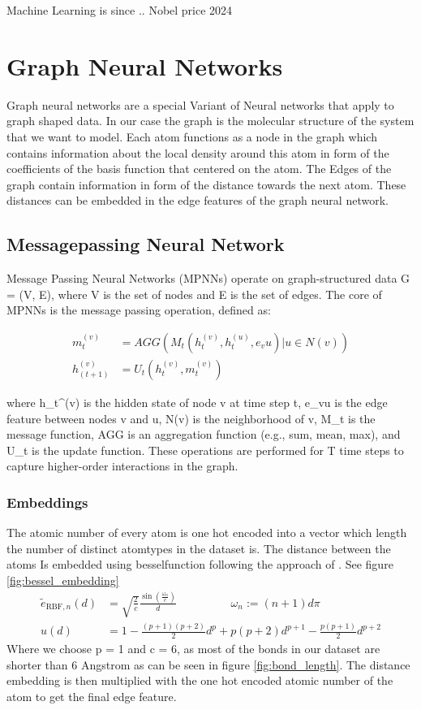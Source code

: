 Machine Learning is since .. Nobel price 2024


\section{Graph Neural Networks}
Graph neural networks are a special Variant of Neural networks that apply to graph shaped data.
In our case the graph is the molecular structure of the system that we want to model. Each atom functions as a node in the graph which contains information about the local density around this atom in form of the coefficients of the basis function that centered on the atom. The Edges of the graph contain information in form of the distance towards the next atom. These distances can be embedded in the edge features of the graph neural network.

\subsection{Messagepassing Neural Network}
Message Passing Neural Networks (MPNNs) operate on graph-structured data G = (V, E), where V is the set of nodes and E is the set of edges. The core of MPNNs is the message passing operation, defined as:

\begin{align}
m_t^(v) &= AGG({M_t(h_t^(v), h_t^(u), e_vu) | u ∈ N(v)})\\
h_(t+1)^(v) &= U_t(h_t^(v), m_t^(v))
\end{align}

where h_t^(v) is the hidden state of node v at time step t, e_vu is the edge feature between nodes v and u, N(v) is the neighborhood of v, M_t is the message function, AGG is an aggregation function (e.g., sum, mean, max), and U_t is the update function. These operations are performed for T time steps to capture higher-order interactions in the graph.

\subsubsection{Embeddings}
The atomic number of every atom is one hot encoded into a vector which length the number of distinct atomtypes in the dataset is. The distance between the atoms Is embedded using besselfunction following the approach of \cite{https://arxiv.org/pdf/2003.03123}. See figure \ref{fig:bessel_embedding}
\begin{align}
    \tilde{e}_{\text{RBF},n}(d) &= \sqrt{\frac{2}{c}}\frac{\sin(\frac{\omega_n }{c})}{d}\hspace{2cm} \omega_n :=(n+1)d\pi\\
    u(d)&= 1-\frac{(p+1)(p+2)}{2}d^p + p(p+2)d^{p+1}-\frac{p(p+1)}{2}d^{p+2}
\end{align}
Where we choose p = 1 and c = 6, as most of the bonds in our dataset are shorter than 6 Angstrom as can be seen in figure \ref{fig:bond_length}. The distance embedding is then multiplied with the one hot encoded atomic number of the atom to get the final edge feature.

